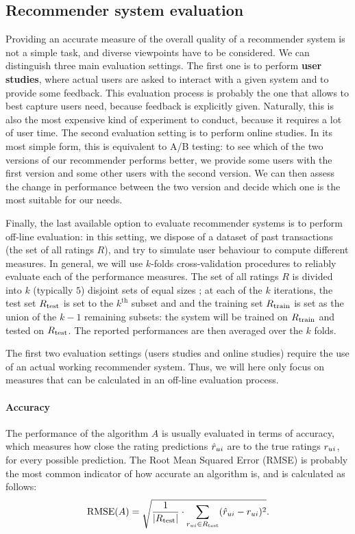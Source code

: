 \subsection{Recommender system evaluation}
\label{SEC:Recommender_system_evaluation}
Providing an accurate measure of the overall quality of a recommender system is
not a simple task, and diverse viewpoints have to be considered.
We can distinguish three main evaluation settings. The first one is to perform
\textbf{user studies}, where actual users are asked to interact with a given system and to
provide some feedback. This evaluation process is probably the one that allows
to best capture users need, because feedback is explicitly given. Naturally,
this is also the most expensive kind of experiment to conduct, because it
requires a lot of user time. The second evaluation setting is to perform online
studies. In its most simple form, this is equivalent to A/B testing: to see
which of the two versions of our recommender performs better, we provide some
users with the first version and some other users with the second version. We
can then assess the change in performance between the two version and decide
which one is the most suitable for our needs.

Finally, the last available option to evaluate recommender systems is to
perform off-line evaluation: in this setting, we dispose of a dataset of past
transactions (the set of all ratings $R$), and try to simulate user behaviour
to compute different measures.  In general, we will use $k$-folds
cross-validation procedures to reliably evaluate each of the performance
measures. The set of all ratings $R$ is divided into $k$ (typically $5$)
disjoint sets of equal sizes ; at each of the $k$ iterations, the test set
$R_{\text{test}}$ is set to the $k^{\text{th}}$ subset and and the training set
$R_{\text{train}}$ is set as the union of the $k - 1$ remaining subsets: the system will
be trained on $R_{\text{train}}$ and tested on $R_{\text{test}}$. The reported performances are
then averaged over the $k$ folds.

The first two evaluation settings (users studies and online studies) require
the use of an actual working recommender system. Thus, we will here only focus
on measures that can be calculated in an off-line evaluation process.

\paragraph{Accuracy\\}
The performance of the algorithm $A$ is usually evaluated in terms of accuracy,
which measures how close the rating predictions $\hat{r}_{ui}$ are to the true
ratings $r_{ui}$, for every possible prediction. The Root Mean Squared Error
(RMSE) is probably the most common indicator of how accurate an algorithm is,
and is calculated as follows:
$$\text{RMSE}(A) = \sqrt{\frac{1}{|R_{\text{test}}|} \cdot \sum_{r_{ui} \in
R_{\text{test}}}(\hat{r}_{ui} - r_{ui})^2}.$$

